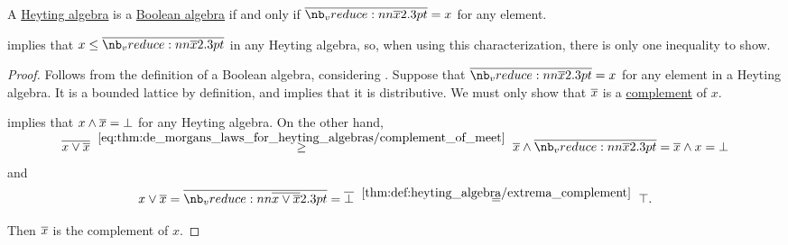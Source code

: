 \begin{proposition}\label{thm:boolean_algebra_heyting_characterization}
  A \hyperref[def:heyting_algebra]{Heyting algebra} is a \hyperref[def:boolean_algebra]{Boolean algebra} if and only if \( \doline{x} = x \) for any element.
\end{proposition}
\begin{comments}
  \item {} implies that \( x \leq \doline{x}\) in any Heyting algebra, so, when using this characterization, there is only one inequality to show.
\end{comments}
\begin{proof}
  \SufficiencySubProof Follows from the definition of a Boolean algebra, considering .
  \NecessitySubProof Suppose that \( \doline{x} = x \) for any element in a Heyting algebra. It is a bounded lattice by definition, and  implies that it is distributive. We must only show that \( \oline{x} \) is a \hyperref[def:bounded_lattice_complement]{complement} of \( x \).

   implies that \( x \wedge \oline{x} = \bot \) for any Heyting algebra. On the other hand,
  \begin{equation*}
    \oline{x \vee \oline{x}}
    \reloset {\eqref{eq:thm:de_morgans_laws_for_heyting_algebras/complement_of_meet}} \geq
    \oline{x} \wedge \doline{x}
    =
    \oline{x} \wedge x
    =
    \bot
  \end{equation*}
  and
  \begin{equation*}
    x \vee \oline{x}
    =
    \doline{x \vee \oline{x}}
    =
    \oline{\bot}
    \reloset {\ref{thm:def:heyting_algebra/extrema_complement}} =
    \top.
  \end{equation*}

  Then \( \oline{x} \) is the complement of \( x \).
\end{proof}

